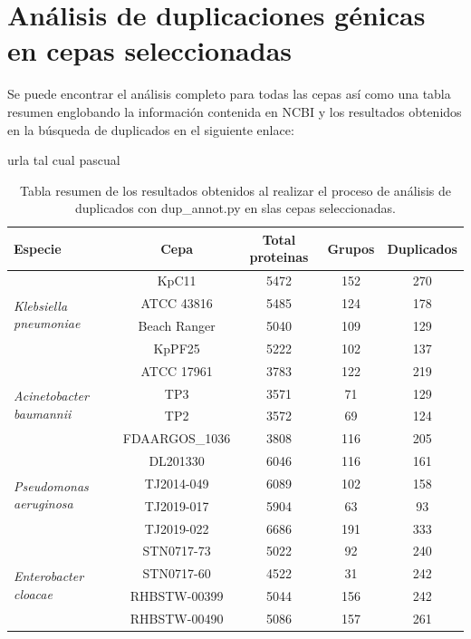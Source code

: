 \pagestyle{plain}

\chapter{Análisis de duplicaciones génicas en cepas seleccionadas}\label{apB}

Se puede encontrar el análisis completo para todas las cepas así como una tabla resumen englobando la información contenida en NCBI y los resultados obtenidos en la búsqueda de duplicados en el siguiente enlace:

urla tal cual pascual

\vspace{10mm}
\begin{table}[h]
	\centering
	\captionsetup{width=\linewidth}
	\caption{Tabla resumen de los resultados obtenidos al realizar el proceso de análisis de duplicados con dup\_annot.py en slas cepas seleccionadas.}
	\begin{tabular}{ l || c || c || c || c }
		\hline
		Especie & Cepa & Total proteinas & Grupos & Duplicados \\
		\hline
		\hline
		\multirow{4}{*}{\textit{Klebsiella pneumoniae}} & KpC11 & 5472 & 152 & 270\\
		& ATCC 43816 & 5485 & 124 & 178 \\
		& Beach Ranger & 5040 & 109 & 129 \\
		& KpPF25 & 5222 & 102 & 137 \\
		\hline
		\multirow{4}{*}{\textit{Acinetobacter baumannii}} & ATCC 17961 & 3783 & 122 & 219 \\
		& TP3 & 3571 & 71 & 129 \\
		& TP2 & 3572 & 69 & 124 \\
		& FDAARGOS\_1036 & 3808 & 116 & 205 \\
		\hline
		\multirow{4}{*}{\textit{Pseudomonas aeruginosa}} & DL201330 & 6046 & 116 & 161 \\
		& TJ2014-049 & 6089 & 102 & 158 \\
		& TJ2019-017 & 5904 & 63 & 93 \\
		& TJ2019-022 & 6686 & 191 & 333 \\
		\hline
		\multirow{4}{*}{\textit{Enterobacter cloacae}} & STN0717-73 & 5022 & 92 & 240 \\
		& STN0717-60 & 4522 & 31 & 242 \\
		& RHBSTW-00399 & 5044 & 156 & 242 \\
		& RHBSTW-00490 & 5086 & 157 & 261 \\
		\hline
	\end{tabular}
	\label{table:cepas_result}
\end{table}

